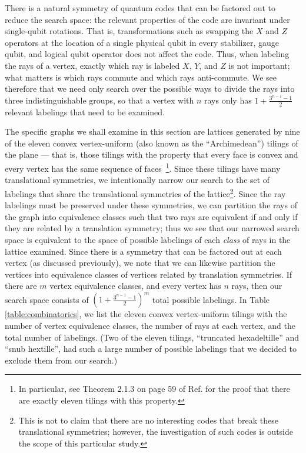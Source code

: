 \documentclass[12pt]{amsbook}
\theoremstyle{plain}
\theoremstyle{definition}
\theoremstyle{remark}
\newcommand{\paren}[1]{\left(#1\right)}
\begin{document}
There is a natural symmetry of quantum codes that can be factored out to reduce the search space:  the relevant properties of the code are invariant under single-qubit rotations.  That is, transformations such as swapping the $X$ and $Z$ operators at the location of a single physical qubit in every stabilizer, gauge qubit, and logical qubit operator does not affect the code.  Thus, when labeling the rays of a vertex, exactly which ray is labeled $X$, $Y$, and $Z$ is not important;  what matters is which rays commute and which rays anti-commute.  We see therefore that we need only search over the possible ways to divide the rays into three indistinguishable groups, so that a vertex with $n$ rays only has $1+\frac{3^{n-1}-1}{2}$ relevant labelings that need to be examined.

The specific graphs we shall examine in this section are lattices generated by nine of the eleven convex vertex-uniform (also known as the ``Archimedean'') tilings of the plane --- that is, those tilings with the property that every face is convex and every vertex has the same sequence of faces~\cite{Gruenbaum1987}\footnote{In particular, see Theorem 2.1.3 on page 59 of Ref. \cite{Gruenbaum1987} for the proof that there are exactly eleven tilings with this property.}.  Since these tilings have many translational symmetries, we intentionally narrow our search to the set of labelings that share the translational symmetries of the lattice\footnote{This is not to claim that there are no interesting codes that break these translational symmetries;  however, the investigation of such codes is outside the scope of this particular study.}.  Since the ray labelings must be preserved under these symmetries, we can partition the rays of the graph into equivalence classes such that two rays are equivalent if and only if they are related by a translation symmetry;  thus we see that our narrowed search space is equivalent to the space of possible labelings of each \emph{class} of rays in the lattice examined.  Since there is a symmetry that can be factored out at each vertex (as discussed previously), we note that we can likewise partition the vertices into equivalence classes of vertices related by translation symmetries.  If there are $m$ vertex equivalence classes, and every vertex has $n$ rays, then our search space consists of $\paren{1+\frac{3^{n-1}-1}{2}}^m$ total possible labelings.  In Table \ref{table:combinatorics}, we list the eleven convex vertex-uniform tilings with the number of vertex equivalence classes, the number of rays at each vertex, and the total number of labelings.  (Two of the eleven tilings, ``truncated hexadeltille'' and ``snub hextille'', had such a large number of possible labelings that we decided to exclude them from our search.)
\end{document}
